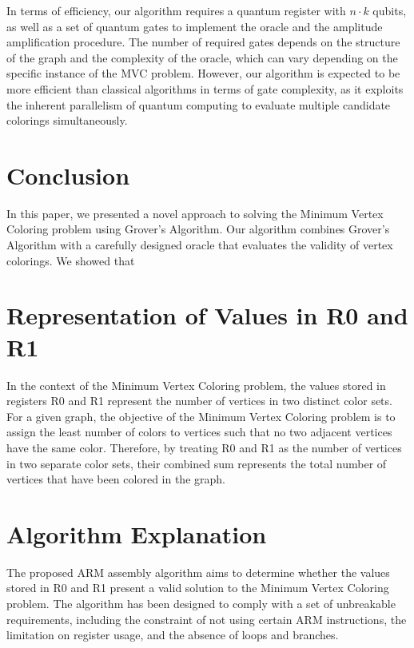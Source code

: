 In terms of efficiency, our algorithm requires a quantum register with $n \cdot k$ qubits, as well as a set of quantum gates to implement the oracle and the amplitude amplification procedure. The number of required gates depends on the structure of the graph and the complexity of the oracle, which can vary depending on the specific instance of the MVC problem. However, our algorithm is expected to be more efficient than classical algorithms in terms of gate complexity, as it exploits the inherent parallelism of quantum computing to evaluate multiple candidate colorings simultaneously.

\section{Conclusion}
\label{sec:conclusion}

In this paper, we presented a novel approach to solving the Minimum Vertex Coloring problem using Grover's Algorithm. Our algorithm combines Grover's Algorithm with a carefully designed oracle that evaluates the validity of vertex colorings. We showed that

\section{Representation of Values in R0 and R1}

In the context of the Minimum Vertex Coloring problem, the values stored in registers R0 and R1 represent the number of vertices in two distinct color sets. For a given graph, the objective of the Minimum Vertex Coloring problem is to assign the least number of colors to vertices such that no two adjacent vertices have the same color. Therefore, by treating R0 and R1 as the number of vertices in two separate color sets, their combined sum represents the total number of vertices that have been colored in the graph.

\section{Algorithm Explanation}

The proposed ARM assembly algorithm aims to determine whether the values stored in R0 and R1 present a valid solution to the Minimum Vertex Coloring problem. The algorithm has been designed to comply with a set of unbreakable requirements, including the constraint of not using certain ARM instructions, the limitation on register usage, and the absence of loops and branches.

